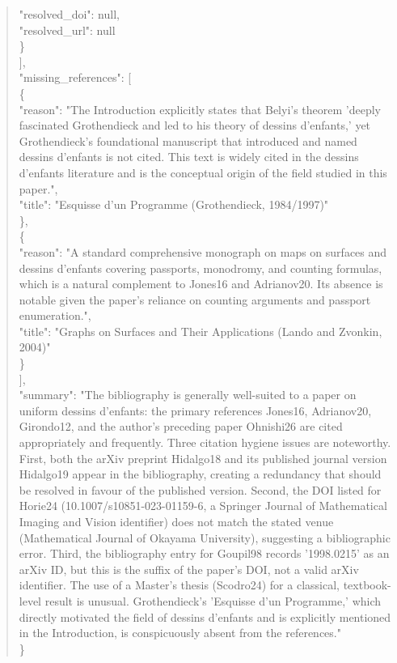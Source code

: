 \documentclass[11pt]{article}
\begin{document}
\begin{quote}
      "resolved\_doi": null,\\
      "resolved\_url": null\\
    \}\\
  ],\\
  "missing\_references": [\\
    \{\\
      "reason": "The Introduction explicitly states that Belyi's theorem 'deeply fascinated Grothendieck and led to his theory of dessins d'enfants,' yet Grothendieck's foundational manuscript that introduced and named dessins d'enfants is not cited. This text is widely cited in the dessins d'enfants literature and is the conceptual origin of the field studied in this paper.",\\
      "title": "Esquisse d'un Programme (Grothendieck, 1984/1997)"\\
    \},\\
    \{\\
      "reason": "A standard comprehensive monograph on maps on surfaces and dessins d'enfants covering passports, monodromy, and counting formulas, which is a natural complement to Jones16 and Adrianov20. Its absence is notable given the paper's reliance on counting arguments and passport enumeration.",\\
      "title": "Graphs on Surfaces and Their Applications (Lando and Zvonkin, 2004)"\\
    \}\\
  ],\\
  "summary": "The bibliography is generally well-suited to a paper on uniform dessins d'enfants: the primary references Jones16, Adrianov20, Girondo12, and the author's preceding paper Ohnishi26 are cited appropriately and frequently. Three citation hygiene issues are noteworthy. First, both the arXiv preprint Hidalgo18 and its published journal version Hidalgo19 appear in the bibliography, creating a redundancy that should be resolved in favour of the published version. Second, the DOI listed for Horie24 (10.1007/s10851-023-01159-6, a Springer Journal of Mathematical Imaging and Vision identifier) does not match the stated venue (Mathematical Journal of Okayama University), suggesting a bibliographic error. Third, the bibliography entry for Goupil98 records '1998.0215' as an arXiv ID, but this is the suffix of the paper's DOI, not a valid arXiv identifier. The use of a Master's thesis (Scodro24) for a classical, textbook-level result is unusual. Grothendieck's 'Esquisse d'un Programme,' which directly motivated the field of dessins d'enfants and is explicitly mentioned in the Introduction, is conspicuously absent from the references."\\
\}\\
\end{quote}
\end{document}
